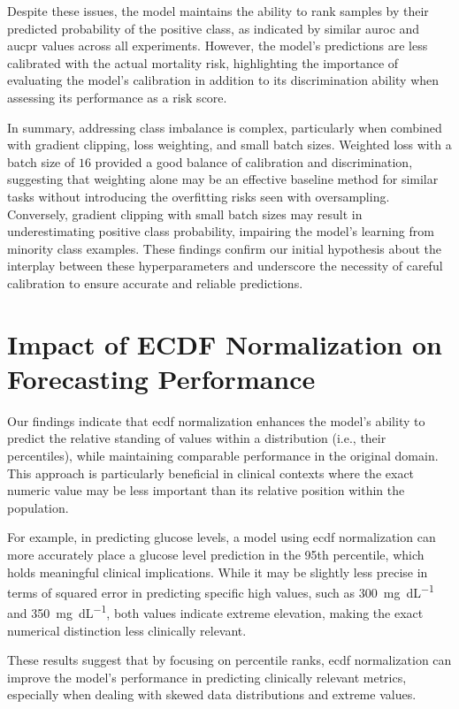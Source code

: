 Despite these issues, the model maintains the ability to rank samples by their predicted probability of the positive class, as indicated by similar \gls{auroc} and \gls{aucpr} values across all experiments. However, the model's predictions are less calibrated with the actual mortality risk, highlighting the importance of evaluating the model's calibration in addition to its discrimination ability when assessing its performance as a risk score.

In summary, addressing class imbalance is complex, particularly when combined with gradient clipping, loss weighting, and small batch sizes. Weighted loss with a batch size of \(16\) provided a good balance of calibration and discrimination, suggesting that weighting alone may be an effective baseline method for similar tasks without introducing the overfitting risks seen with oversampling. Conversely, gradient clipping with small batch sizes may result in underestimating positive class probability, impairing the model’s learning from minority class examples. These findings confirm our initial hypothesis about the interplay between these hyperparameters and underscore the necessity of careful calibration to ensure accurate and reliable predictions.

\section{Impact of ECDF Normalization on Forecasting Performance}
\label{sec:forecasting_performance}

Our findings indicate that \gls{ecdf} normalization enhances the model's ability to predict the relative standing of values within a distribution (i.e., their percentiles), while maintaining comparable performance in the original domain. This approach is particularly beneficial in clinical contexts where the exact numeric value may be less important than its relative position within the population.

For example, in predicting glucose levels, a model using \gls{ecdf} normalization can more accurately place a glucose level prediction in the 95th percentile, which holds meaningful clinical implications. While it may be slightly less precise in terms of squared error in predicting specific high values, such as \qty{300}{\mg\per\deci\liter} and \qty{350}{\mg\per\deci\liter}, both values indicate extreme elevation, making the exact numerical distinction less clinically relevant.

These results suggest that by focusing on percentile ranks, \gls{ecdf} normalization can improve the model's performance in predicting clinically relevant metrics, especially when dealing with skewed data distributions and extreme values.

